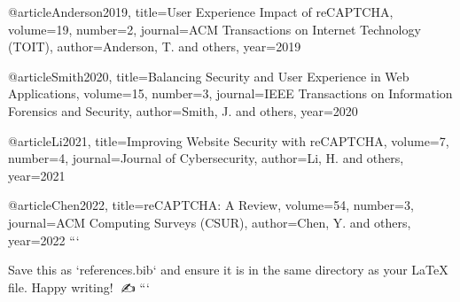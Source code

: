 @article{Anderson2019,
  title={User Experience Impact of reCAPTCHA},
  volume={19},
  number={2},
  journal={ACM Transactions on Internet Technology (TOIT)},
  author={Anderson, T. and others},
  year={2019}
}

@article{Smith2020,
  title={Balancing Security and User Experience in Web Applications},
  volume={15},
  number={3},
  journal={IEEE Transactions on Information Forensics and Security},
  author={Smith, J. and others},
  year={2020}
}

@article{Li2021,
  title={Improving Website Security with reCAPTCHA},
  volume={7},
  number={4},
  journal={Journal of Cybersecurity},
  author={Li, H. and others},
  year={2021}
}

@article{Chen2022,
  title={reCAPTCHA: A Review},
  volume={54},
  number={3},
  journal={ACM Computing Surveys (CSUR)},
  author={Chen, Y. and others},
  year={2022}
}
```

Save this as `references.bib` and ensure it is in the same directory as your LaTeX file. Happy writing! 🌟✍️
```